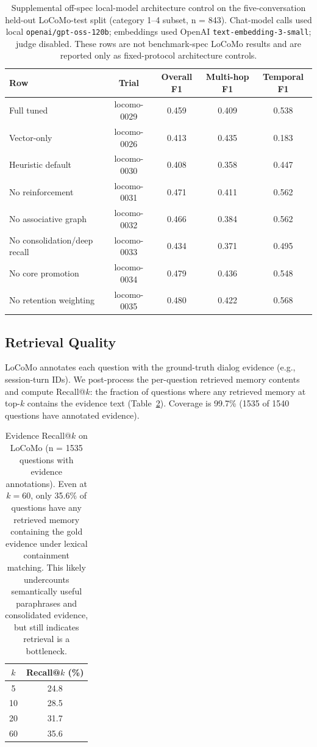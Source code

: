 \documentclass[11pt,a4paper]{article}
\begin{document}
\begin{table}[htbp]
\centering
\small
\begin{tabular}{@{}lcccc@{}}
\toprule
\textbf{Row} & \textbf{Trial} & \textbf{Overall F1} & \textbf{Multi-hop F1} & \textbf{Temporal F1} \\
\midrule
Full tuned & locomo-0029 & 0.459 & 0.409 & 0.538 \\
Vector-only & locomo-0026 & 0.413 & 0.435 & 0.183 \\
Heuristic default & locomo-0030 & 0.408 & 0.358 & 0.447 \\
No reinforcement & locomo-0031 & 0.471 & 0.411 & 0.562 \\
No associative graph & locomo-0032 & 0.466 & 0.384 & 0.562 \\
No consolidation/deep recall & locomo-0033 & 0.434 & 0.371 & 0.495 \\
No core promotion & locomo-0034 & 0.479 & 0.436 & 0.548 \\
No retention weighting & locomo-0035 & 0.480 & 0.422 & 0.568 \\
\bottomrule
\end{tabular}
\caption{Supplemental off-spec local-model architecture control on the five-conversation held-out LoCoMo-test split (category 1--4 subset, n = 843). Chat-model calls used local \texttt{openai/gpt-oss-120b}; embeddings used OpenAI \texttt{text-embedding-3-small}; judge disabled. These rows are not benchmark-spec LoCoMo results and are reported only as fixed-protocol architecture controls.}
\label{tab:local-control}
\end{table}

\subsection{Retrieval Quality}
\label{sec:eval-retrieval}

LoCoMo annotates each question with the ground-truth dialog evidence (e.g., session-turn IDs). We post-process the per-question retrieved memory contents and compute Recall@$k$: the fraction of questions where any retrieved memory at top-$k$ contains the evidence text (Table~\ref{tab:recall}). Coverage is 99.7\% (1535 of 1540 questions have annotated evidence).

\begin{table}[htbp]
\centering
\small
\begin{tabular}{@{}cc@{}}
\toprule
$k$ & \textbf{Recall@$k$ (\%)} \\
\midrule
5 & 24.8 \\
10 & 28.5 \\
20 & 31.7 \\
60 & 35.6 \\
\bottomrule
\end{tabular}
\caption{Evidence Recall@$k$ on LoCoMo (n = 1535 questions with evidence annotations). Even at $k = 60$, only 35.6\% of questions have any retrieved memory containing the gold evidence under lexical containment matching. This likely undercounts semantically useful paraphrases and consolidated evidence, but still indicates retrieval is a bottleneck.}
\label{tab:recall}
\end{table}
\end{document}
